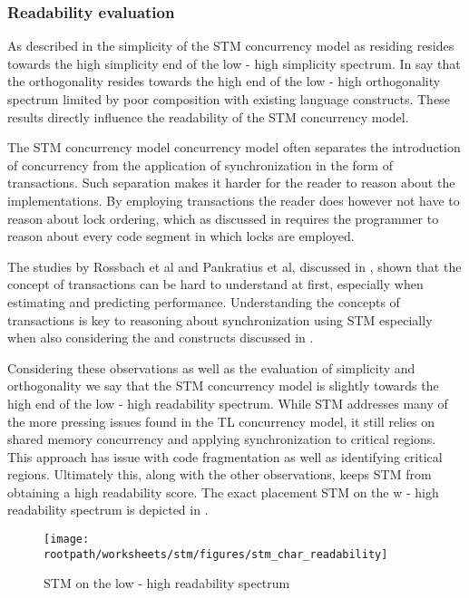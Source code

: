 \subsubsection{Readability evaluation}
As described in  the simplicity of the \ac{STM} concurrency model as residing resides towards the high simplicity end of the low - high simplicity spectrum. In  say that the orthogonality resides towards the high end of the low - high orthogonality spectrum limited by poor composition with existing language constructs. These results directly influence the readability of the \ac{STM} concurrency model.

The \ac{STM} concurrency model concurrency model often separates the introduction of concurrency from the application of synchronization in the form of transactions. Such separation makes it harder for the reader to reason about the implementations. By employing transactions the reader does however not have to reason about lock ordering, which as discussed in  requires the programmer to reason about every code segment in which locks are employed.

The studies by Rossbach et al and Pankratius et al, discussed in , shown that the concept of transactions can be hard to understand at first, especially when estimating and predicting performance. Understanding the concepts of transactions is key to reasoning about synchronization using \ac{STM} especially when also considering the  and  constructs discussed in .

Considering these observations as well as the evaluation of simplicity and orthogonality we say that the \ac{STM} concurrency model is slightly towards the high end of the low - high readability spectrum. While \ac{STM} addresses many of the more pressing issues found in the \ac{TL} concurrency model, it still relies on shared memory concurrency and applying synchronization to critical regions. This approach has issue with code fragmentation as well as identifying critical regions. Ultimately this, along with the other observations, keeps \ac{STM} from obtaining a high readability score. The exact placement \ac{STM} on the w - high readability spectrum is depicted in .


\begin{figure}[htbp]
\centering
 \texttt{[image: \\rootpath/worksheets/stm/figures/stm\_char\_readability]} 
 \caption{\ac{STM} on the low - high readability spectrum}
\label{fig:char_stm_readability}
\end{figure}



